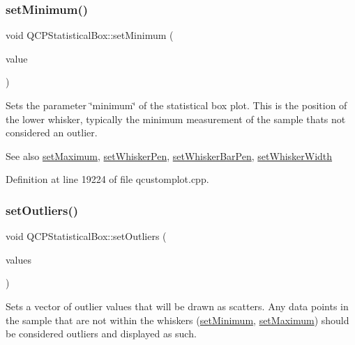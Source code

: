 \subsubsection{\texorpdfstring{set\+Minimum()}{setMinimum()}}
{\footnotesize\ttfamily void Q\+C\+P\+Statistical\+Box\+::set\+Minimum (\begin{DoxyParamCaption}\item[{double}]{value }\end{DoxyParamCaption})}

Sets the parameter \char`\"{}minimum\char`\"{} of the statistical box plot. This is the position of the lower whisker, typically the minimum measurement of the sample that\textquotesingle{}s not considered an outlier.

\begin{DoxySeeAlso}{See also}
\hyperlink{class_q_c_p_statistical_box_acec5ad1901f00f2c5387cfb4d9787eb3}{set\+Maximum}, \hyperlink{class_q_c_p_statistical_box_a4a5034cb3b9b040444df05ab1684620b}{set\+Whisker\+Pen}, \hyperlink{class_q_c_p_statistical_box_aa8d3e503897788e1abf68dc74b5f147f}{set\+Whisker\+Bar\+Pen}, \hyperlink{class_q_c_p_statistical_box_adf378812446bd66f34d1f7f293d991cd}{set\+Whisker\+Width} 
\end{DoxySeeAlso}


Definition at line 19224 of file qcustomplot.\+cpp.

\mbox{\label{class_q_c_p_statistical_box_af9bc09620e0bf93bf444ee35e5800d1d}} 
\subsubsection{\texorpdfstring{set\+Outliers()}{setOutliers()}}
{\footnotesize\ttfamily void Q\+C\+P\+Statistical\+Box\+::set\+Outliers (\begin{DoxyParamCaption}\item[{const Q\+Vector$<$ double $>$ \&}]{values }\end{DoxyParamCaption})}

Sets a vector of outlier values that will be drawn as scatters. Any data points in the sample that are not within the whiskers (\hyperlink{class_q_c_p_statistical_box_a84ff7cc61ba44890f0c3e0c99c19941e}{set\+Minimum}, \hyperlink{class_q_c_p_statistical_box_acec5ad1901f00f2c5387cfb4d9787eb3}{set\+Maximum}) should be considered outliers and displayed as such.

